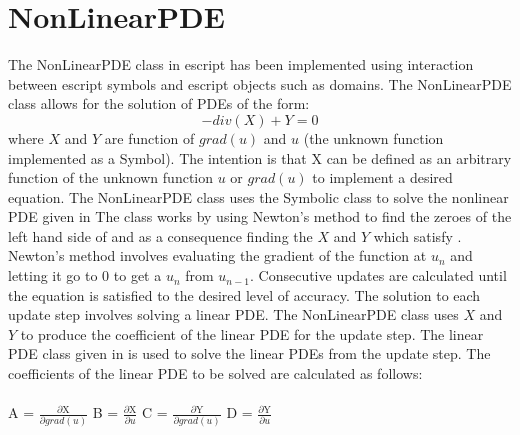 \section{NonLinearPDE}
The NonLinearPDE class in escript has been implemented using interaction between escript symbols and escript objects such as domains. The NonLinearPDE class allows for the solution of PDEs of the form:
\begin{equation}
-div(X) + Y = 0
\label{symbolic eq1}
\end{equation}
where $X$ and $Y$ are function of $grad(u)$ and $u$ (the unknown function implemented as a Symbol).
The intention is that X can be defined as an arbitrary function of the unknown function $u$ or $grad(u)$ to implement a desired equation.
The NonLinearPDE class uses the Symbolic class to solve the nonlinear PDE given in 
The class works by using Newton's method to find the zeroes of the left hand side of  and as a consequence finding the
$X$ and $Y$ which satisfy . 
Newton's method involves evaluating the gradient of the function at $u_n$ and letting it go to 0 to get a $u_n$ from $u_{n-1}$. Consecutive updates are calculated until the equation is
satisfied to the desired level of accuracy. The solution to each update step involves solving a linear PDE. The NonLinearPDE class uses $X$ and $Y$ to produce the coefficient of the linear PDE for the update step. The linear PDE class given in  is used to solve the linear PDEs from the update step. The coefficients of the linear PDE to be solved are calculated as follows: \\\\
{
\centering 
 A = $\frac{\partial \text{X}}{\partial grad(u)}$   B = $\frac{\partial \text{X}}{\partial u}$   C = $\frac{\partial \text{Y}}{\partial grad(u)}$    D = $\frac{\partial \text{Y}}{\partial u}$
}
